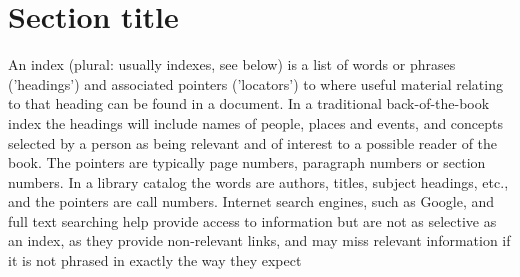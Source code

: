 \section{Section title}
An index (plural: usually indexes, see below) is a list of words or phrases ('headings') and associated pointers ('locators') to where useful material relating to that heading can be found in a document. In a traditional back-of-the-book index the headings will include names of people, places and events, and concepts selected by a person as being relevant and of interest to a possible reader of the book. The pointers are typically page numbers, paragraph numbers or section numbers. In a library catalog the words are authors, titles, subject headings, etc., and the pointers are call numbers. Internet search engines, such as Google, and full text searching help provide access to information but are not as selective as an index, as they provide non-relevant links, and may miss relevant information if it is not phrased in exactly the way they expect
